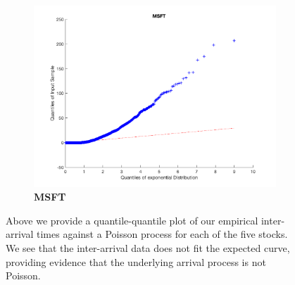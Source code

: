 \begin{figure}[htbp]
\vspace{3mm}

\begin{subfigure}[t]{0.49\textwidth}
\captionsetup{labelformat=empty}

\caption{\textbf{MSFT}}
\includegraphics[width=\textwidth, trim = 0 0 0 30, clip]{QQ_Plots/MSFT_QQ.png}
\end{subfigure}

\caption{\label{fig:poisson} Above we provide a quantile-quantile plot of our empirical inter-arrival times against a Poisson process for each of the five stocks. We see that the inter-arrival data does not fit the expected curve, providing evidence that the underlying arrival process is not Poisson.}
\end{figure}